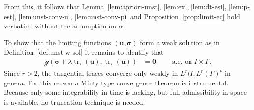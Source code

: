 \documentclass[reqno,a4paper]{amsart}
\def\vec#1{\boldsymbol{#1}}
\def\tr{\mathop{\mathrm{tr}}\nolimits}
\def\b0{\vec{0}}
\def\bu{\vec{u}}
\def\bsigma{\vec{\sigma}}
\def\gbd{\vec{\mathcal{g}}}
\begin{document}
	From this, it follows that Lemma~\ref{lem:apriori-unst}, \ref{lem:ex}, \ref{lem:dt-est}, \ref{lem:p-est}, \ref{lem:unst-conv-u}, \ref{lem:unst-conv-pi} and Proposition~\ref{prop:limit-eq} hold verbatim, without the assumption on $\alpha$. 
	
	To show that the limiting functions $(\bu,\bsigma)$ form a weak solution as in Definition~\ref{def:unst-w-sol} it remains to identify that 
	\begin{align}
		\gbd(\bsigma + \lambda \tr_{\tau} (\bu), \tr_{\tau}(\bu))&=\b0 \qquad \text{ a.e. on } I\times \Gamma. 
	\end{align}
	Since $r>2$, the tangential traces converge only weakly in $L^{r}(I;L^r(\Gamma)^d$ in genera. 
	For this reason a Minty type convergence theorem is instrumental. 
	Because only some integrability in time is lacking, but full admissibility in space is available, no truncation technique is needed. 
	
\end{document}
